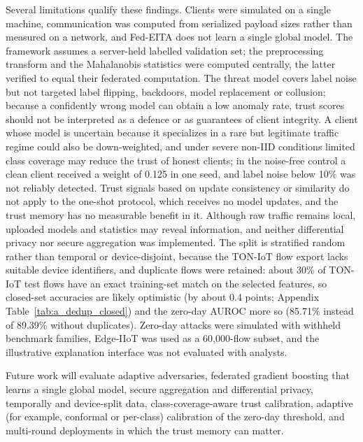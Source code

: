 \documentclass[pdflatex,sn-mathphys-num]{sn-jnl}
\newcommand{\Rtwo}{\color{blue}}
\begin{document}
{{{{Several limitations qualify these findings. Clients were simulated on a single machine, communication was computed from serialized payload sizes rather than measured on a network, and Fed-EITA does not learn a single global model. The framework assumes a server-held labelled validation set; the preprocessing transform and the Mahalanobis statistics were computed centrally, the latter verified to equal their federated computation. The threat model covers label noise but not targeted label flipping, backdoors, model replacement or collusion; because a confidently wrong model can obtain a low anomaly rate, trust scores should not be interpreted as a defence or as guarantees of client integrity. A client whose model is uncertain because it specializes in a rare but legitimate traffic regime could also be down-weighted, and under severe non-IID conditions limited class coverage may reduce the trust of honest clients{\Rtwo ; in the noise-free control a clean client received a weight of 0.125 in one seed, and label noise below 10\% was not reliably detected}. Trust signals based on update consistency or similarity do not apply to the one-shot protocol, which receives no model updates, and the trust memory has no measurable benefit in it. Although raw traffic remains local, uploaded models and statistics may reveal information, and neither differential privacy nor secure aggregation was implemented. The split is stratified random rather than temporal or device-disjoint, because the TON-IoT flow export lacks suitable device identifiers, and duplicate flows were retained: about 30\% of TON-IoT test flows have an exact training-set match on the selected features, so closed-set accuracies are likely optimistic {\Rtwo (by about 0.4 points; Appendix Table~\ref{tab:a_dedup_closed}) and the zero-day AUROC more so (85.71\% instead of 89.39\% without duplicates)}. Zero-day attacks were simulated with withheld benchmark families, Edge-IIoT was used as a 60{,}000-flow subset, and the illustrative explanation interface was not evaluated with analysts.

Future work will evaluate adaptive adversaries, federated gradient boosting that learns a single global model, secure aggregation and differential privacy, temporally and device-split data, class-coverage-aware trust calibration, adaptive (for example, conformal or per-class) calibration of the zero-day threshold, and multi-round deployments in which the trust memory can matter.



}}}}
\end{document}
